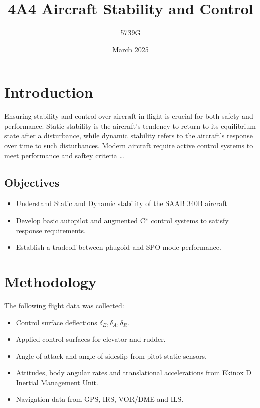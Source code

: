 \documentclass{article}
\begin{document}
\title{4A4 Aircraft Stability and Control}
\author{5739G}
\date{March 2025}
\maketitle

\section{Introduction}

Ensuring stability and control over aircraft in flight is crucial for both safety and performance.
Static stability is the aircraft's tendency to return to its equilibrium state after a disturbance, while dynamic stability refers to the aircraft's response over time to such disturbances.
Modern aircraft require active control systems to meet performance and saftey criteria \dots

\subsection{Objectives}

\begin{itemize}
    \item Understand Static and Dynamic stability of the SAAB 340B aircraft
    \item Develop basic autopilot and augmented C* control systems to satisfy response requirements.
    \item Establish a tradeoff between phugoid and SPO mode performance.
\end{itemize}

\section{Methodology}

The following flight data was collected:
\begin{itemize}
    \item Control surface deflections $\delta_E, \delta_A, \delta_R$.
    \item Applied control surfaces for elevator and rudder.
    \item Angle of attack and angle of sideslip from pitot-static sensors.
    \item Attitudes, body angular rates and translational accelerations from Ekinox D Inertial Management Unit.
    \item Navigation data from GPS, IRS, VOR/DME and ILS.
\end{itemize}
\end{document}
